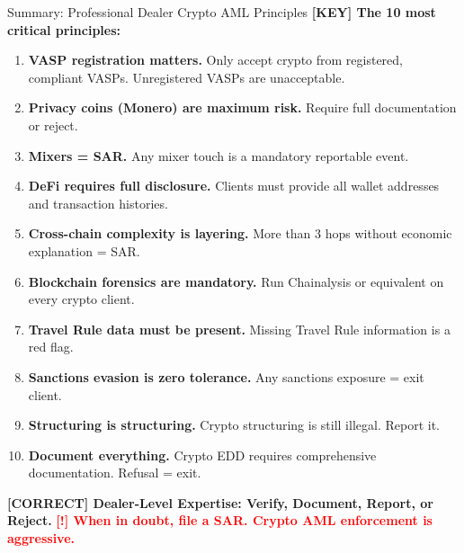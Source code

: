 \documentclass[11pt,a4paper]{beamer}
\newcommand{\redflag}[1]{\textcolor{red}{\textbf{[!] #1}}}
\newcommand{\greennote}[1]{\textcolor{green!50!black}{\textbf{[CORRECT] #1}}}
\newcommand{\keyterm}[1]{\textcolor{red!80!black}{\textbf{[KEY] #1}}}
\begin{document}
	\begin{frame}{Summary: Professional Dealer Crypto AML Principles}
		\tiny
		\keyterm{The 10 most critical principles:}
		\begin{enumerate}
			\item \textbf{VASP registration matters.} Only accept crypto from registered, compliant VASPs. Unregistered VASPs are unacceptable.
			\item \textbf{Privacy coins (Monero) are maximum risk.} Require full documentation or reject.
			\item \textbf{Mixers = SAR.} Any mixer touch is a mandatory reportable event.
			\item \textbf{DeFi requires full disclosure.} Clients must provide all wallet addresses and transaction histories.
			\item \textbf{Cross-chain complexity is layering.} More than 3 hops without economic explanation = SAR.
			\item \textbf{Blockchain forensics are mandatory.} Run Chainalysis or equivalent on every crypto client.
			\item \textbf{Travel Rule data must be present.} Missing Travel Rule information is a red flag.
			\item \textbf{Sanctions evasion is zero tolerance.} Any sanctions exposure = exit client.
			\item \textbf{Structuring is structuring.} Crypto structuring is still illegal. Report it.
			\item \textbf{Document everything.} Crypto EDD requires comprehensive documentation. Refusal = exit.
		\end{enumerate}
		\vspace{0.3cm}
		\centering
		\greennote{Dealer-Level Expertise: Verify, Document, Report, or Reject.}
		\vspace{0.1cm}
		\redflag{When in doubt, file a SAR. Crypto AML enforcement is aggressive.}
	\end{frame}
	
\end{document}
